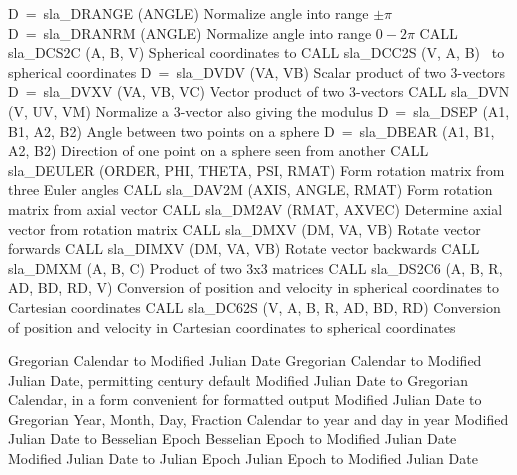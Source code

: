 \begin{callset}
     {D~=~sla\_DRANGE (ANGLE)}
   Normalize angle into range $\pm\pi$
     {D~=~sla\_DRANRM (ANGLE)}
   Normalize angle into range $0\!-\!2\pi$
     {CALL sla\_DCS2C (A, B, V)}
   Spherical coordinates to \xyz
{}
     {CALL sla\_DCC2S (V, A, B)}
   \xyz\ to spherical coordinates
     {D~=~sla\_DVDV (VA, VB)}
   Scalar product of two 3-vectors
     {D~=~sla\_DVXV (VA, VB, VC)}
   Vector product of two 3-vectors
     {CALL sla\_DVN (V, UV, VM)}
   Normalize a 3-vector also giving the modulus
     {D~=~sla\_DSEP (A1, B1, A2, B2)}
   Angle between two points on a sphere
     {D~=~sla\_DBEAR (A1, B1, A2, B2)}
   Direction of one point on a sphere seen from another
     {CALL sla\_DEULER (ORDER, PHI, THETA, PSI, RMAT)}
   Form rotation matrix from three Euler angles
     {CALL sla\_DAV2M (AXIS, ANGLE, RMAT)}
   Form rotation matrix from axial vector
     {CALL sla\_DM2AV (RMAT, AXVEC)}
   Determine axial vector from rotation matrix
     {CALL sla\_DMXV (DM, VA, VB)}
   Rotate vector forwards
     {CALL sla\_DIMXV (DM, VA, VB)}
   Rotate vector backwards
     {CALL sla\_DMXM (A, B, C)}
   Product of two 3x3 matrices
     {CALL sla\_DS2C6 (A, B, R, AD, BD, RD, V)}
   Conversion of position and velocity in spherical
     coordinates to Cartesian coordinates
     {CALL sla\_DC62S (V, A, B, R, AD, BD, RD)}
   Conversion of position and velocity in Cartesian
     coordinates to spherical coordinates
\end{callset}

\begin{callset}
   Gregorian Calendar to Modified Julian Date
   Gregorian Calendar to Modified Julian Date,
     permitting century default
   Modified Julian Date to Gregorian Calendar,
     in a form convenient for formatted output
   Modified Julian Date to Gregorian Year, Month, Day, Fraction
   Calendar to year and day in year
   Modified Julian Date to Besselian Epoch
   Besselian Epoch to Modified Julian Date
   Modified Julian Date to Julian Epoch
   Julian Epoch to Modified Julian Date
\end{callset}


